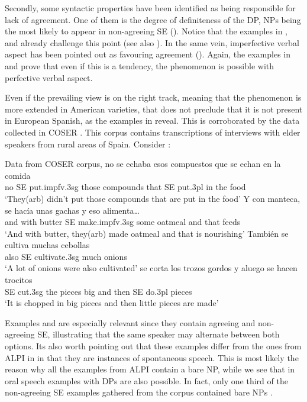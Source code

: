 \documentclass[output=paper,colorlinks,citecolor=brown]{langscibook}
\begin{document}
Secondly, some syntactic properties have been identified as being responsible for lack of agreement. One of them is the degree of definiteness of the DP, NPs being the most likely to appear in non-agreeing SE (\citealt[1677]{Mendikoetxea1999}). Notice that the examples in ,  and  already challenge this point (see also \cite{DeMello1995}). In the same vein, imperfective verbal aspect has been pointed out as favouring agreement (\citealt[1678]{Mendikoetxea1999}). Again, the examples in  and  prove that even if this is a tendency, the phenomenon is possible with perfective verbal aspect.

Even if the prevailing view is on the right track, meaning that the phenomenon is more extended in American varieties, that does not preclude that it is not present in European Spanish, as the examples in  reveal. This is corroborated by the data collected in COSER \citep{COSER}. This corpus contains transcriptions of interviews with elder speakers from rural areas of Spain. Consider :

\ea\label{ex:05:COSER} Data from COSER corpus, \citep{COSER}
    \ea\label{ex:05:COSERa}
        \gll no se echaba esos compuestos que se echan en la comida \\
        no SE put.impfv.3sg those compounds that SE put.3pl in the food \\
        \glt ‘They(arb) didn’t put those compounds that are put in the food’
    \ex
        \gll Y con manteca, se hacía unas gachas y eso alimenta…\\
        and with butter SE make.impfv.3sg some oatmeal and that feeds \\
        \glt ‘And with butter, they(arb) made oatmeal and that is nourishing’
    \ex
        \gll También se cultiva muchas cebollas \\
        also SE cultivate.3sg much onions \\
        \glt ‘A lot of onions were also cultivated’
    \ex\label{ex:05:COSERd}
        \gll se corta los trozos gordos y aluego se hacen trocitos \\
        SE cut.3sg the pieces big and then SE do.3pl pieces \\
        \glt ‘It is chopped in big pieces and then little pieces are made’
\z \z

Examples  and  are especially relevant since they contain agreeing and non-agreeing SE, illustrating that the same speaker may alternate between both options. Its also worth pointing out that these examples differ from the ones from ALPI in  in that they are instances of spontaneous speech. This is most likely the reason why all the examples from ALPI contain a bare NP, while we see that in oral speech examples with DPs are also possible. In fact, only one third of the non-agreeing SE examples gathered from the corpus contained bare NPs \citep{Arias_Fernandez2020}.
\end{document}
